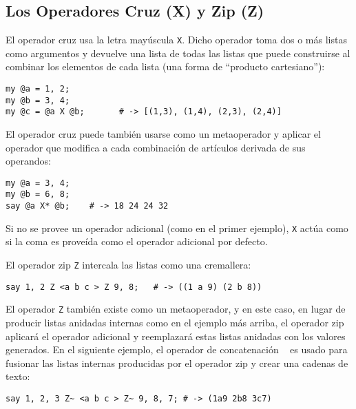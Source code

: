 \subsection{Los Operadores Cruz (X) y Zip (Z)}

El operador cruz usa la letra mayúscula \verb|X|. Dicho operador
toma dos o  más listas como argumentos y devuelve una lista de
todas las listas que puede construirse al combinar los elementos
de cada lista (una forma de ``producto cartesiano''):

\begin{verbatim}
my @a = 1, 2;
my @b = 3, 4;
my @c = @a X @b;       # -> [(1,3), (1,4), (2,3), (2,4)]
\end{verbatim}

El operador cruz puede también usarse como un metaoperador y 
aplicar el operador que modifica a cada combinación de artículos
derivada de sus operandos:

\begin{verbatim}
my @a = 3, 4;
my @b = 6, 8;
say @a X* @b;    # -> 18 24 24 32
\end{verbatim}

Si no se provee un operador adicional (como en el primer ejemplo), 
\verb"X" actúa como si la coma es proveída como el operador adicional
por defecto.

El operador zip \verb|Z| intercala las listas como una cremallera:

\begin{verbatim}
say 1, 2 Z <a b c > Z 9, 8;   # -> ((1 a 9) (2 b 8))
\end{verbatim}

El operador \verb|Z| también existe como un metaoperador, y 
en este caso, en lugar de producir listas anidadas internas
como en el ejemplo más arriba, el operador zip aplicará el 
operador adicional y reemplazará estas listas anidadas con
los valores generados. En el siguiente ejemplo, el operador
de concatenación ~ es usado para fusionar las listas internas 
producidas por el operador zip y crear una cadenas de texto:

\begin{verbatim}
say 1, 2, 3 Z~ <a b c > Z~ 9, 8, 7; # -> (1a9 2b8 3c7)
\end{verbatim}

